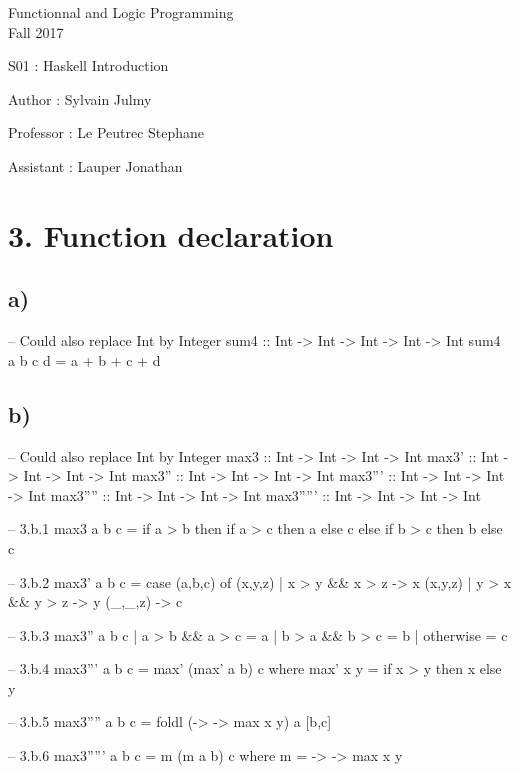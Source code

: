 \documentclass[a4paper,11pt]{report}
\author{Sylvain Julmy}
\date{\today}
\begin{document}
\begin{center}
\Large{
    Functionnal and Logic Programming\\
    Fall 2017
  }
  
  \noindent\makebox[\linewidth]{\rule{\linewidth}{0.4pt}}
  S01 : Haskell Introduction

  \vspace*{1.4cm}

  Author : Sylvain Julmy
  \noindent\makebox[\linewidth]{\rule{\linewidth}{0.4pt}}

  \begin{flushleft}
    Professor : Le Peutrec Stephane
    
    Assistant : Lauper Jonathan
  \end{flushleft}

  \noindent\makebox[\linewidth]{\rule{\textwidth}{1pt}}
\end{center}

\section*{3. Function declaration}
\subsection*{a)}
\begin{haskellcode}
-- Could also replace Int by Integer
sum4 :: Int -> Int -> Int -> Int -> Int
sum4 a b c d = a + b + c + d
\end{haskellcode}


\subsection*{b)}
\begin{haskellcode}
-- Could also replace Int by Integer
max3 :: Int -> Int -> Int -> Int
max3' :: Int -> Int -> Int -> Int
max3'' :: Int -> Int -> Int -> Int
max3''' :: Int -> Int -> Int -> Int
max3'''' :: Int -> Int -> Int -> Int
max3''''' :: Int -> Int -> Int -> Int

-- 3.b.1
max3 a b c =
  if a > b then
    if a > c then
      a
    else
      c
  else if b > c then
      b
  else c

-- 3.b.2
max3' a b c = case (a,b,c) of
  (x,y,z) | x > y && x > z -> x
  (x,y,z) | y > x && y > z -> y
  (_,_,z) -> c

-- 3.b.3
max3'' a b c
  | a > b && a > c = a
  | b > a && b > c = b
  | otherwise = c

-- 3.b.4
max3''' a b c = max' (max' a b) c where
  max' x y = if x > y then x else y

-- 3.b.5
max3'''' a b c = foldl (\x -> \y -> max x y) a [b,c]

-- 3.b.6
max3''''' a b c = m (m a b) c where
  m = \x -> \y -> max x y
\end{haskellcode}
\end{document}
